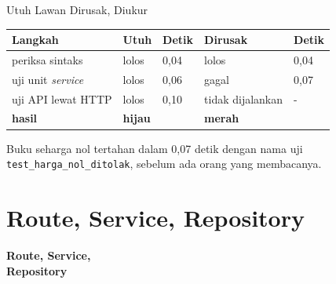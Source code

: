 \documentclass[aspectratio=169, table, 12pt]{beamer}
\begin{document}
\begin{frame}{{\Large Utuh Lawan Dirusak, Diukur}}
  \vspace{6pt}
  \centering
  {\footnotesize
  \begin{tabularx}{\textwidth}{Yllll}
    \hline
    \textbf{Langkah} & \textbf{Utuh} & \textbf{Detik} & \textbf{Dirusak} & \textbf{Detik} \\
    \hline
    periksa sintaks & lolos & 0,04 & lolos & 0,04 \\
    \hline
    uji unit \textit{service} & lolos & 0,06 & gagal & 0,07 \\
    \hline
    uji API lewat HTTP & lolos & 0,10 & tidak dijalankan & - \\
    \hline
    \textbf{hasil} & \textbf{hijau} & & \textbf{merah} & \\
    \hline
  \end{tabularx}}

  \vspace{6pt}
  {\small Buku seharga nol tertahan dalam 0,07 detik dengan nama uji
  \texttt{test\_harga\_nol\_ditolak}, sebelum ada orang yang membacanya.}
\end{frame}

\section{Route, Service, Repository}

\begin{frame}{\hfill}
  \centering
  \Huge{\textbf{Route, Service,\\Repository}}
\end{frame}
\end{document}
